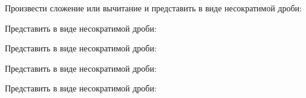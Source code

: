 \begin{homework}[number=2]
	\begin{listofex}
	\item Произвести сложение или вычитание и представить в виде несократимой дроби:
	\begin{itasks}[2]
		\task {}
		\task {}
		\task {}
		\task {}
	\end{itasks}
	\item Представить в виде несократимой дроби:
	\begin{itasks}[2]
		\task {}
		\task {}
		\task {}
		\task {}
		\task {}
		\task {}
		\task {}
	\end{itasks}
	\item Представить в виде несократимой дроби:
	\begin{itasks}[2]
		\task {}
		\task {}
		\task {}
		\task {}
		\task {}
	\end{itasks}
	\item Представить в виде несократимой дроби:
	\begin{itasks}[2]
		\task {}
		\task {}
		\task {}
		\task {}
	\end{itasks}
	\item Представить в виде несократимой дроби:
	\begin{itasks}[2]
		\task {}
		\task {}
		\task {}
		\task {}
		\task {}
		\task {}
		\task {}
	\end{itasks}
	\end{listofex}
\end{homework}

